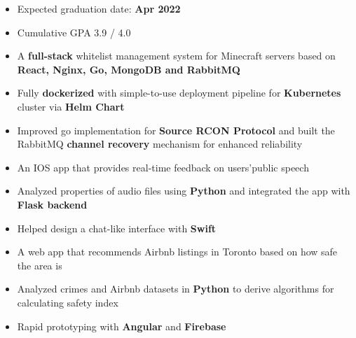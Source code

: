 
\begin{itemize}
\item Expected graduation date: \textbf{Apr 2022}
\item Cumulative GPA 3.9 \// 4.0 
\end{itemize}


\vspace{-2mm}
\begin{itemize}
 \item A \textbf{full-stack} whitelist management system for Minecraft servers based on \textbf{React, Nginx, Go, MongoDB and RabbitMQ}
 \item Fully \textbf{dockerized} with simple-to-use deployment pipeline for \textbf{Kubernetes} cluster via \textbf{Helm Chart}
 \item Improved go implementation for \textbf{Source RCON Protocol}  and built the RabbitMQ \textbf{channel recovery} mechanism for enhanced reliability
 
\end{itemize}
\divider
\vspace{-2mm}
\vspace{-1mm}
\begin{itemize}
\item An IOS app that provides real-time feedback on users\rq  \space public speech
\item Analyzed properties of audio files using \textbf{Python} and integrated the app with \textbf{Flask backend}
\item Helped design a chat-like interface with \textbf{Swift}
\end{itemize}
\vspace{-2mm}
\divider
\vspace{-2mm}
\vspace{-3mm}
\begin{itemize}
\item A web app that recommends
Airbnb listings in Toronto based on how
safe the area is
\item  Analyzed crimes and Airbnb
datasets in \textbf{Python} to derive algorithms for
calculating safety index
\item Rapid prototyping with \textbf{Angular} and \textbf{Firebase}
\end{itemize}



